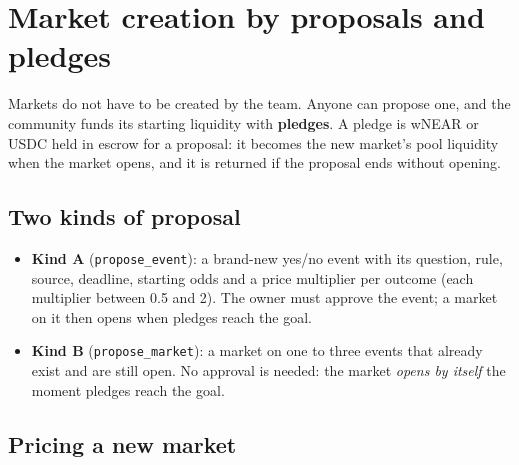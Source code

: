 \documentclass[11pt,a4paper]{article}
\newcommand{\code}[1]{\texttt{\small #1}}
\begin{document}
\section{Market creation by proposals and pledges}
\label{sec:catalog}

Markets do not have to be created by the team. Anyone can propose one, and the community funds its starting
liquidity with \textbf{pledges}. A pledge is wNEAR or USDC held in escrow for a proposal: it becomes the new market's
pool liquidity when the market opens, and it is returned if the proposal ends without opening.

\subsection{Two kinds of proposal}

\begin{itemize}
  \item \textbf{Kind A} (\code{propose\_event}): a brand-new yes/no event with its question, rule, source, deadline,
  starting odds and a price multiplier per outcome (each multiplier between 0.5 and 2). The owner must approve the
  event; a market on it then opens when pledges reach the goal.
  \item \textbf{Kind B} (\code{propose\_market}): a market on one to three events that already exist and are still
  open. No approval is needed: the market \emph{opens by itself} the moment pledges reach the goal.
\end{itemize}

\subsection{Pricing a new market}
\end{document}
